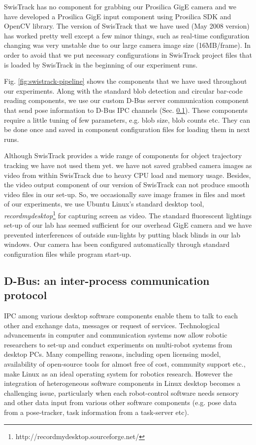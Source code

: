 SwisTrack has no component for grabbing our Prosilica GigE camera and we have developed a Prosilica GigE input component using Prosilica SDK and OpenCV library. The version of SwisTrack that we have used (May 2008 version) has worked pretty well except a few minor things, such as real-time configuration changing was very unstable due to our large camera image size (16MB/frame). In order to avoid that we put necessary configurations in SwisTrack project files that is loaded by SwisTrack in the beginning of our experiment runs.

Fig. \ref{fig:swistrack-pipeline} shows the components that we have used throughout our experiments. Along with the standard blob detection and circular bar-code reading components, we use our custom D-Bus server communication component that send pose information to D-Bus \acf{IPC} channels (Sec. \ref{expt-tools:dbus}). These components require a little tuning of few parameters, e.g. blob size, blob counts etc. They can be done once and saved in component configuration files for loading them in next runs. 

Although SwisTrack provides a wide range of components for object trajectory tracking we have not used them yet. we have not saved grabbed camera images as video from within SwisTrack due to heavy CPU load and memory usage. Besides, the video output component of our version of SwisTrack can not produce smooth video files in our set-up. So, we occasionally save image frames in files and most of our experiments, we use Ubuntu Linux's standard desktop  tool, {\em recordmydesktop}\footnote{http://recordmydesktop.sourceforge.net/} for capturing screen as video. The standard fluorescent lightings set-up of our lab has seemed sufficient for our overhead GigE camera and we have prevented interferences of outside sun-lights by putting black blinds in our lab windows. Our camera has been configured automatically through standard configuration files while program start-up.
\subsection{D-Bus: an inter-process communication protocol}
\label{expt-tools:dbus}
IPC among various desktop software components enable them to talk to each other and exchange data, messages or request of services. Technological advancements in computer and communication systems now allow robotic researchers to set-up and conduct experiments on multi-robot systems from desktop PCs. Many compelling reasons, including open licensing model, availability of open-source tools for almost free of cost, community support etc., make Linux as an ideal operating system for robotics research. However the integration of heterogeneous software components in Linux desktop becomes a challenging issue, particularly when each robot-control software needs sensory and other data input from various other software components (e.g. pose data from a pose-tracker, task information from a task-server etc).

